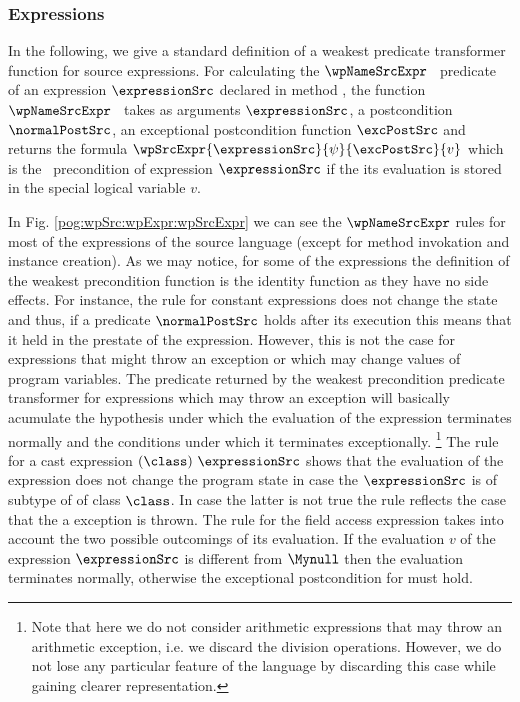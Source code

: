 \subsubsection{Expressions}\label{pog:wpSrc:wpExpr}
In the following, we  give a standard  definition of a weakest
predicate transformer function for source expressions. %
For calculating the  $\wpNameSrcExpr$ \ predicate  of  an expression $\expressionSrc$ declared in method \methodd,
 the function $\wpNameSrcExpr$ \ takes as arguments  $\expressionSrc$, a postcondition $\normalPostSrc$, an exceptional postcondition 
function $\excPostSrc$  and  returns the    formula $\wpSrcExpr{\expressionSrc}{\psi}{\excPostSrc}{ v }$ which is the \wpName \ precondition of expression $\expressionSrc$ 
if the its evaluation is stored in the special logical variable $v$.  

In Fig. \ref{pog:wpSrc:wpExpr:wpSrcExpr} we can see the $\wpNameSrcExpr$ rules for  most of the expressions of the source language (except for method invokation 
and instance creation). As we may notice, for some of the expressions   
the definition of the weakest precondition function is the identity function
 as they have  no side effects. For instance, the rule for constant expressions does not change the state and thus,
 if a predicate $ \normalPostSrc$ holds
 after its execution this means that it held in the prestate of the expression. 
 However, this is not the case for expressions that might throw an exception or which may change values of program variables.
 The predicate returned by the weakest precondition predicate transformer for expressions which may throw an exception 
will basically acumulate the hypothesis under which the evaluation 
of the expression terminates normally and the  conditions under which it  terminates exceptionally.
\footnote{Note that here we do not consider arithmetic expressions that may throw
an arithmetic exception, i.e. we discard the division operations.
 However,   we do not lose any particular feature of the language by discarding this case 
while gaining clearer representation.} The rule for a cast expression $( \class ) \ \expressionSrc$ shows that the evaluation of the expression
does not change the program state in case the $ \expressionSrc$ is of subtype of of class  $\class$. In case the latter is not true 
the rule reflects the case that the a  \ClassCastExc{} exception is thrown. The rule for the field access expression takes into account
the two possible  outcomings of its evaluation. If the evaluation $v$ of the expression $\expressionSrc$ 
is different from $\Mynull$ then the evaluation terminates normally, otherwise the exceptional postcondition  
for \NullPointerExc{}  must hold.

